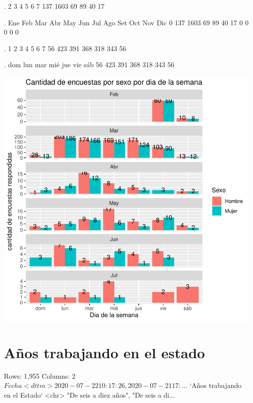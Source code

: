 \documentclass{article}
\begin{document}
\begin{Schunk}
\begin{Soutput}
.
   2    3    4    5    6    7 
 137 1603   69   89   40   17 
\end{Soutput}
\begin{Soutput}
.
 Ene  Feb  Mar  Abr  May  Jun  Jul  Ago  Set  Oct  Nov  Dic 
   0  137 1603   69   89   40   17    0    0    0    0    0 
\end{Soutput}
\begin{Soutput}
.
  1   2   3   4   5   6   7 
 56 423 391 368 318 343  56 
\end{Soutput}
\begin{Soutput}
.
dom lun mar mié jue vie sáb 
 56 423 391 368 318 343  56 
\end{Soutput}
\end{Schunk}
\includegraphics{seguimientov4-016}


\section{Años trabajando en el estado}

\begin{Schunk}
\begin{Soutput}
Rows: 1,955
Columns: 2
$ Fecha                          <dttm> 2020-07-22 10:17:26, 2020-07-21 17:...
$ `Años trabajando en el Estado` <chr> "De seis a diez años", "De seis a di...
\end{Soutput}
\end{Schunk}
\end{document}
